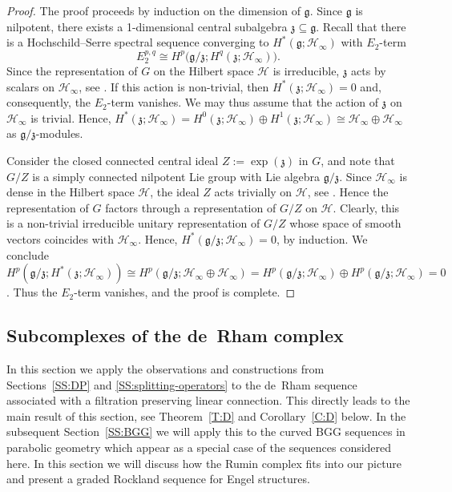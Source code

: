 \documentclass[reqno,12pt]{amsart}
\newcommand\goe{\mathfrak g}
\newcommand\zoe{\mathfrak z}
\theoremstyle{plain}
\theoremstyle{definition}
\begin{document}
\begin{proof}
The proof proceeds by induction on the dimension of $\goe$.
Since $\goe$ is nilpotent, there exists a 1-dimensional central subalgebra $\zoe\subseteq\goe$.
Recall that there is a Hochschild--Serre spectral sequence \cite{HS53} converging to $H^*(\goe;\mathcal H_\infty)$ with $E_2$-term 
$$
E_2^{p,q}\cong H^p\bigl(\goe/\zoe;H^q(\zoe;\mathcal H_\infty)\bigr).
$$
Since the representation of $G$ on the Hilbert space $\mathcal H$ is irreducible, $\zoe$ acts by scalars on $\mathcal H_\infty$, see \cite[Theorem~5 in Appendix~V]{K04}.
If this action is non-trivial, then $H^*(\zoe;\mathcal H_\infty)=0$ and, consequently, the $E_2$-term vanishes.
We may thus assume that the action of $\zoe$ on $\mathcal H_\infty$ is trivial. 
Hence, $H^*(\zoe;\mathcal H_\infty)=H^0(\zoe;\mathcal H_\infty)\oplus H^1(\zoe;\mathcal H_\infty)\cong\mathcal H_\infty\oplus\mathcal H_\infty$ as $\goe/\zoe$-modules.


Consider the closed connected central ideal $Z:=\exp(\zoe)$ in $G$, and note that $G/Z$ is a simply connected nilpotent Lie group with Lie algebra $\goe/\zoe$.
Since $\mathcal H_\infty$ is dense in the Hilbert space $\mathcal H$, the ideal $Z$ acts trivially on $\mathcal H$, see \cite[Theorem~4 in Appendix~V]{K04}.
Hence the representation of $G$ factors through a representation of $G/Z$ on $\mathcal H$.
Clearly, this is a non-trivial irreducible unitary representation of $G/Z$ whose space of smooth vectors coincides with $\mathcal H_\infty$.
Hence, $H^*(\goe/\zoe;\mathcal H_\infty)=0$, by induction.
We conclude $H^p(\goe/\zoe;H^*(\zoe;\mathcal H_\infty))\cong H^p(\goe/\zoe;\mathcal H_\infty\oplus\mathcal H_\infty)=H^p(\goe/\zoe;\mathcal H_\infty)\oplus H^p(\goe/\zoe;\mathcal H_\infty)=0$.
Thus the $E_2$-term vanishes, and the proof is complete.
\end{proof}






\subsection{Subcomplexes of the de~Rham complex}\label{SS:subdeRham}






In this section we apply the observations and constructions from Sections~\ref{SS:DP} and \ref{SS:splitting-operators} to the de~Rham sequence associated with a filtration preserving linear connection.
This directly leads to the main result of this section, see Theorem~\ref{T:D} and Corollary~\ref{C:D} below.
In the subsequent Section~\ref{SS:BGG} we will apply this to the curved BGG sequences in parabolic geometry which appear as a special case of the sequences considered here.
In this section we will discuss how the Rumin complex fits into our picture and present a graded Rockland sequence for Engel structures.
\end{document}
